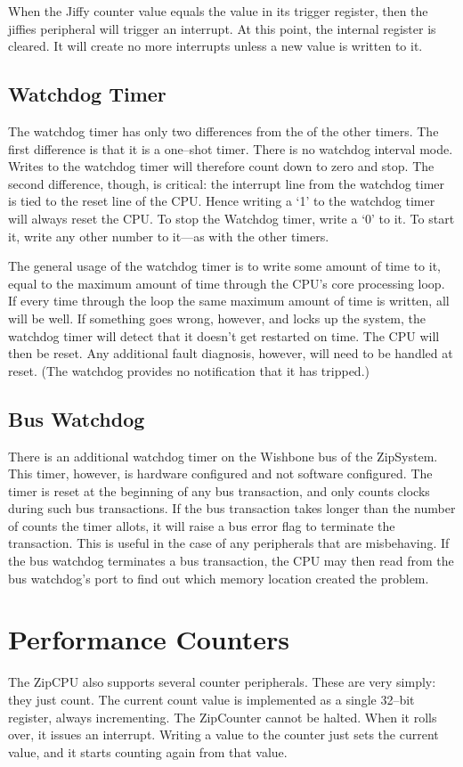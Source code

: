 \documentclass{gqtekspec}
\begin{document}
When the Jiffy counter value equals the value in its trigger register, then
the jiffies peripheral will trigger an interrupt.  At this point, the internal
register is cleared.  It will create no more interrupts unless a new value
is written to it.
\subsection{Watchdog Timer}
The watchdog timer has only two differences from the of the other timers.
The first difference is that it is a one--shot timer.  There is no watchdog
interval mode.  Writes to the watchdog timer will therefore count down to
zero and stop.  The second difference, though, is critical: the interrupt
line from the watchdog timer is tied to the reset line of the CPU.  Hence
writing a `1' to the watchdog timer will always reset the CPU.  To stop the
Watchdog timer, write a `0' to it.  To start it, write any other number to
it---as with the other timers.

The general usage of the watchdog timer is to write some amount of time to it,
equal to the maximum amount of time through the CPU's core processing loop.
If every time through the loop the same maximum amount of time is written,
all will be well.  If something goes wrong, however, and locks up the system,
the watchdog timer will detect that it doesn't get restarted on time.  The
CPU will then be reset.  Any additional fault diagnosis, however, will need
to be handled at reset.  (The watchdog provides no notification that it has
tripped.)

\subsection{Bus Watchdog}
There is an additional watchdog timer on the Wishbone bus of the ZipSystem. 
This timer,
however, is hardware configured and not software configured.  The timer is
reset at the beginning of any bus transaction, and only counts clocks during
such bus transactions.  If the bus transaction takes longer than the number
of counts the timer allots, it will raise a bus error flag to terminate the
transaction.  This is useful in the case of any peripherals that are
misbehaving.  If the bus watchdog terminates a bus transaction, the CPU may
then read from the bus watchdog's port to find out which memory location
created the problem.
\section{Performance Counters}
The ZipCPU also supports several counter peripherals.  These are very simply:
they just count.  The current count value is implemented as a single 32--bit
register, always incrementing.  The ZipCounter cannot be halted.  When it
rolls over, it issues an interrupt.  Writing a value to the counter just
sets the current value, and it starts counting again from that value.
\end{document}
